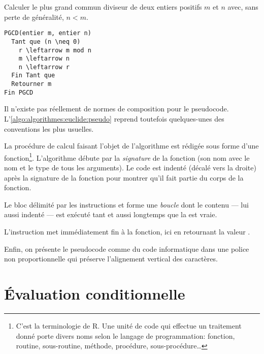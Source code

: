 \begin{algorithme}
  \label{algo:algorithmes:euclide:pseudo}
  Calculer le plus grand commun diviseur de deux entiers positifs $m$
  et $n$ avec, sans perte de généralité, $n < m$.
\begin{Schunk}
\begin{Verbatim}[commandchars=\\\{\}]
PGCD(entier m, entier n)
  Tant que (n \neq 0)
    r \leftarrow m mod n
    m \leftarrow n
    n \leftarrow r
  Fin Tant que
  Retourner m
Fin PGCD
\end{Verbatim}
\end{Schunk}
\end{algorithme}


Il n'existe pas réellement de normes de composition pour le
pseudocode. L'\autoref{algo:algorithmes:euclide:pseudo} reprend
toutefois quelques-unes des conventions les plus usuelles.

La procédure de calcul faisant l'objet de l'algorithme est rédigée
sous forme d'une fonction\footnote{%
  C'est la terminologie de R. Une unité de code qui effectue un
  traitement donné porte divers noms selon le langage de
  programmation: fonction, routine, sous-routine, méthode, procédure,
  sous-procédure\dots}. %
L'algorithme débute par la \emph{signature} de la
fonction (son nom avec le nom et le type de tous les arguments). Le
code est indenté (décalé vers la droite) après la
signature de la fonction pour montrer qu'il fait partie du corps de la
fonction.

Le bloc délimité par les instructions  et  forme une
\emph{boucle} dont le contenu --- lui aussi indenté ---
est exécuté tant et aussi longtemps que la  est vraie.

L'instruction  met immédiatement fin à la fonction,
ici en retournant la valeur .

Enfin, on présente le pseudocode comme du code informatique dans une
police non proportionnelle qui préserve l'alignement vertical des
caractères.


\section{Évaluation conditionnelle}
\label{sec:algorithmes:if-else}

